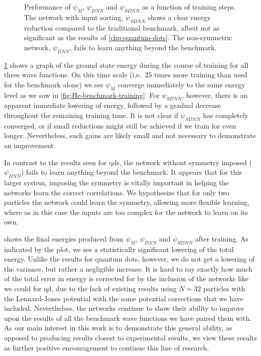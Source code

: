 \documentclass[Thesis.tex]{subfiles}
\begin{document}
\begin{figure}[h]
  \centering
  
  \caption[Learning progression of a neural network on liquid
  helium]{\label{fig:He-dnn-training}Performance of $\psi_M$, $\psi_{DNN}$ and $\psi_{SDNN}$
    as a function of training steps. The network with input sorting, $\psi_{SDNN}$ shows a clear energy reduction
    compared to the traditional benchmark, albeit not as significant as the
    results of \cref{chp:quantum-dots}. The non-symmetric network, $\psi_{DNN}$, fails
    to learn anything beyond the benchmark.}
\end{figure}

\cref{fig:He-dnn-training} shows a graph of the ground state energy during the
course of training for all three wave functions. On this time scale (i.e.\ $\num{25}$
times more training than used for the benchmark alone) we see $\psi_M$ converge
immediately to the same energy level as we saw in
\cref{fig:He-benchmark-training}. For $\psi_{SDNN}$, however, there is an
apparent immediate lowering of energy, followed by a gradual decrease throughout
the remaining training time. It is not clear if $\psi_{SDNN}$ has completely
converged, or if small reductions might still be achieved if we train for even
longer. Nevertheless, such gains are likely small and not necessary to
demonstrate an improvement.


In contrast to the results seen for \glspl{qd}, the network without symmetry
imposed ($\psi_{DNN}$) fails to learn anything beyond the benchmark. It appears
that for this larger system, imposing the symmetry is vitally important in
helping the networks learn the correct correlations. We hypothesize that for only two
particles the network could learn the symmetry, allowing more
flexible learning, where as in this case the inputs are too complex for the
network to learn on its own.


 shows the final energies produced from $\psi_{M}$,
$\psi_{DNN}$ and $\psi_{SDNN}$ after training. As indicated by the plot, we see
a statistically significant lowering of the total energy. Unlike the results for
quantum dots, however, we do not get a lowering of the variance, but rather a
negligible increase. It is hard to say exactly how much of the total error in energy
is corrected for by the inclusion of the networks like we could for \gls{qd}, due to the lack of existing
results using $N=32$ particles with the Lennard-Jones potential with the same
potential corrections that we have included. Nevertheless, the networks continue
to show their ability to improve upon the results of all the benchmark wave
functions we have paired them with. As our main interest in this work is to
demonstrate this general ability, as opposed to producing results closest to
experimental results, we view these results as further positive encouragement to
continue this line of research.
\end{document}
